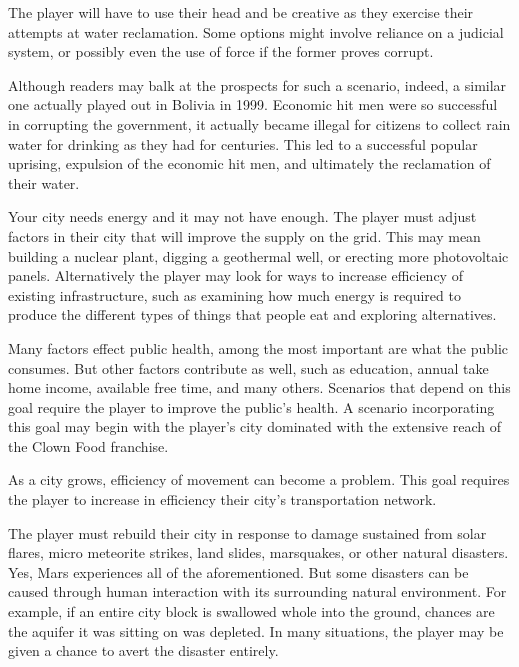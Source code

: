 The player will have to use their head and be creative as they exercise their attempts at water reclamation. Some options might involve reliance on a judicial system, or possibly even the use of force if the former proves corrupt.

Although readers may balk at the prospects for such a scenario, indeed, a similar one actually played out in Bolivia in 1999. Economic hit men were so successful in corrupting the government, it actually became illegal for citizens to collect rain water for drinking as they had for centuries. This led to a successful popular uprising, expulsion of the economic hit men, and ultimately the reclamation of their water.


Your city needs energy and it may not have enough. The player must adjust factors in their city that will improve the supply on the grid. This may mean building a nuclear plant, digging a geothermal well, or erecting more photovoltaic panels. Alternatively the player may look for ways to increase efficiency of existing infrastructure, such as examining how much energy is required to produce the different types of things that people eat and exploring alternatives.


Many factors effect public health, among the most important are what the public consumes. But other factors contribute as well, such as education, annual take home income, available free time, and many others. Scenarios that depend on this goal require the player to improve the public's health. A scenario incorporating this goal may begin with the player's city dominated with the extensive reach of the Clown Food franchise.


As a city grows, efficiency of movement can become a problem. This goal requires the player to increase in efficiency their city's transportation network.


The player must rebuild their city in response to damage sustained from solar flares, micro meteorite strikes, land slides, marsquakes, or other natural disasters. Yes, Mars experiences all of the aforementioned. But some  disasters can be caused through human interaction with its surrounding natural environment. For example, if an entire city block is swallowed whole into the ground, chances are the aquifer it was sitting on was depleted. In many situations, the player may be given a chance to avert the disaster entirely.

